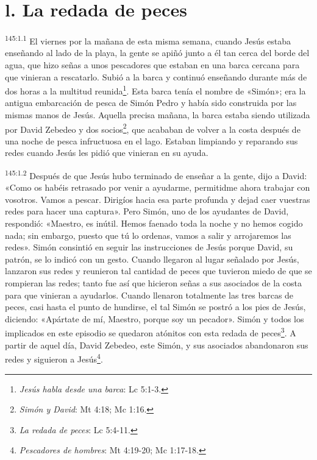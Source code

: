 \section*{l. La redada de peces}
\par
\textsuperscript{145:1.1} El viernes por la mañana de esta misma semana, cuando Jesús estaba enseñando al lado de la playa, la gente se apiñó junto a él tan cerca del borde del agua, que hizo señas a unos pescadores que estaban en una barca cercana para que vinieran a rescatarlo. Subió a la barca y continuó enseñando durante más de dos horas a la multitud reunida\footnote{\textit{Jesús habla desde una barca}: Lc 5:1-3.}. Esta barca tenía el nombre de «Simón»; era la antigua embarcación de pesca de Simón Pedro y había sido construida por las mismas manos de Jesús. Aquella precisa mañana, la barca estaba siendo utilizada por David Zebedeo y dos socios\footnote{\textit{Simón y David}: Mt 4:18; Mc 1:16.}, que acababan de volver a la costa después de una noche de pesca infructuosa en el lago. Estaban limpiando y reparando sus redes cuando Jesús les pidió que vinieran en su ayuda.

\par
\textsuperscript{145:1.2} Después de que Jesús hubo terminado de enseñar a la gente, dijo a David: «Como os habéis retrasado por venir a ayudarme, permitidme ahora trabajar con vosotros. Vamos a pescar. Dirigíos hacia esa parte profunda y dejad caer vuestras redes para hacer una captura». Pero Simón, uno de los ayudantes de David, respondió: «Maestro, es inútil. Hemos faenado toda la noche y no hemos cogido nada; sin embargo, puesto que tú lo ordenas, vamos a salir y arrojaremos las redes». Simón consintió en seguir las instrucciones de Jesús porque David, su patrón, se lo indicó con un gesto. Cuando llegaron al lugar señalado por Jesús, lanzaron sus redes y reunieron tal cantidad de peces que tuvieron miedo de que se rompieran las redes; tanto fue así que hicieron señas a sus asociados de la costa para que vinieran a ayudarlos. Cuando llenaron totalmente las tres barcas de peces, casi hasta el punto de hundirse, el tal Simón se postró a los pies de Jesús, diciendo: «Apártate de mí, Maestro, porque soy un pecador». Simón y todos los implicados en este episodio se quedaron atónitos con esta redada de peces\footnote{\textit{La redada de peces}: Lc 5:4-11.}. A partir de aquel día, David Zebedeo, este Simón, y sus asociados abandonaron sus redes y siguieron a Jesús\footnote{\textit{Pescadores de hombres}: Mt 4:19-20; Mc 1:17-18.}.

